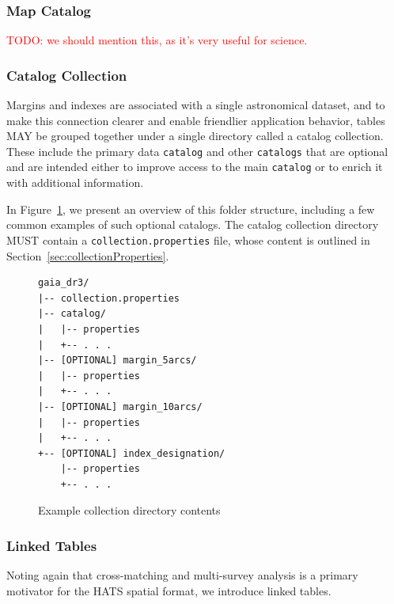 \documentclass[11pt,a4paper]{ivoa}
\begin{document}
\subsubsection{Map Catalog} \label{sec:mapCatalog}

\textcolor{red}{TODO: we should mention this, as it's very useful for science. }

\subsubsection{Catalog Collection} \label{sec:collection}

Margins and indexes are associated with a single astronomical dataset, and to make this connection clearer and enable friendlier application behavior, tables MAY be grouped together under a single directory called a catalog collection.
These include the primary data \texttt{catalog} and other \texttt{catalogs} that are optional and are intended either to improve access to the main \texttt{catalog} or to enrich it with additional information. 

In Figure~\ref{fig:exampleCollectionStructure}, we present an overview of this folder structure, including a few common examples of such optional catalogs.
The catalog collection directory MUST contain a \texttt{collection.properties} file, whose content is outlined in Section~\ref{sec:collectionProperties}.

\begin{figure}
\begin{minipage}{\linewidth}
\begin{lstlisting}
gaia_dr3/
|-- collection.properties
|-- catalog/
|   |-- properties
|   +-- . . .
|-- [OPTIONAL] margin_5arcs/
|   |-- properties
|   +-- . . .
|-- [OPTIONAL] margin_10arcs/
|   |-- properties
|   +-- . . .
+-- [OPTIONAL] index_designation/
    |-- properties
    +-- . . .
\end{lstlisting}
\end{minipage}
\caption{Example collection directory contents}
\label{fig:exampleCollectionStructure}
\end{figure}

\subsubsection{Linked Tables} \label{sec:linkedTables}

Noting again that cross-matching and multi-survey analysis is a primary motivator for the HATS spatial format, we introduce linked tables.
\end{document}

